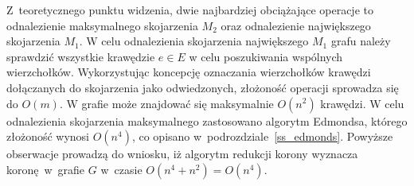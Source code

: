 \begin{bproof}
  Z~teoretycznego punktu widzenia, dwie najbardziej obciążające operacje to odnalezienie maksymalnego skojarzenia $M_2$ oraz odnalezienie największego skojarzenia $M_1$.
  W celu odnalezienia skojarzenia największego $M_1$ grafu należy sprawdzić wszystkie krawędzie $e\in E$ w celu poszukiwania wspólnych wierzchołków.
  Wykorzystując koncepcję oznaczania wierzchołków krawędzi dołączanych do skojarzenia jako odwiedzonych, złożoność operacji sprowadza się do $O(m)$.
  W grafie może znajdować się maksymalnie $O(n^{2})$ krawędzi.
  W celu odnalezienia skojarzenia maksymalnego zastosowano algorytm Edmondsa, którego złożoność wynosi $O(n^{4})$, co opisano w~podrozdziale~\ref{ss_edmonds}.
  Powyższe obserwacje prowadzą do wniosku, iż algorytm redukcji korony wyznacza koronę w~grafie $G$ w~czasie $O(n^{4} + n^{2})=O(n^{4})$.
\end{bproof}
